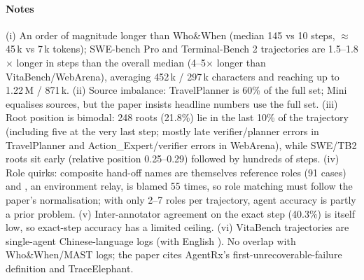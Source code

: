 \paragraph{Notes} (i) An order of magnitude longer than Who\&When (median 145 vs 10 steps, $\approx$45\,k vs 7\,k tokens); SWE-bench Pro and Terminal-Bench 2 trajectories are 1.5--1.8$\times$ longer in steps than the overall median (4--5$\times$ longer than VitaBench/WebArena), averaging 452\,k / 297\,k characters and reaching up to 1.22\,M / 871\,k. (ii) Source imbalance: TravelPlanner is 60\% of the full set; Mini equalises sources, but the paper insists headline numbers use the full set. (iii) Root position is bimodal: 248 roots (21.8\%) lie in the last 10\% of the trajectory (including five at the very last step; mostly late verifier/planner errors in TravelPlanner and Action\_Expert/verifier errors in WebArena), while SWE/TB2 roots sit early (relative position 0.25--0.29) followed by hundreds of steps. (iv) Role quirks: composite hand-off names are themselves reference roles (91 cases) and , an environment relay, is blamed 55 times, so role matching must follow the paper's normalisation; with only 2--7 roles per trajectory, agent accuracy is partly a prior problem. (v) Inter-annotator agreement on the exact step (40.3\%) is itself low, so exact-step accuracy has a limited ceiling. (vi) VitaBench trajectories are single-agent Chinese-language logs (with English ). No overlap with Who\&When/MAST logs; the paper cites AgentRx's first-unrecoverable-failure definition and TraceElephant.
